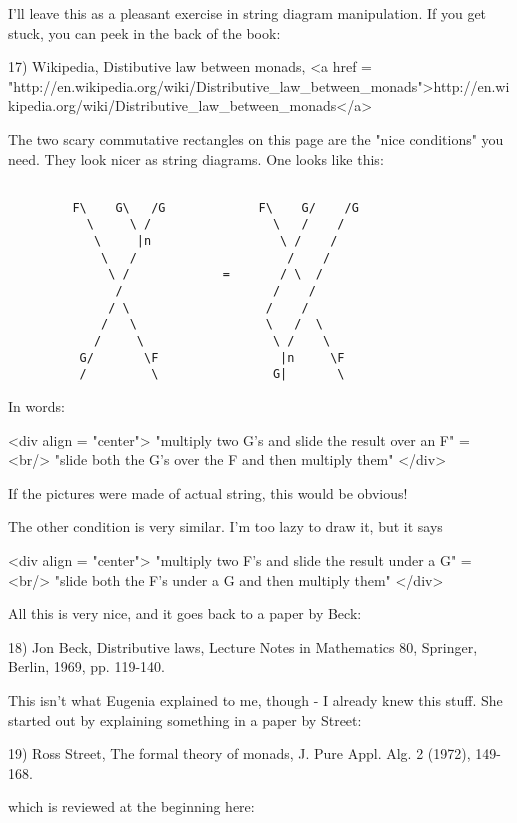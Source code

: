 I'll leave this as a pleasant exercise in string diagram 
manipulation.  If you get stuck, you can peek in the back of 
the book:

17) Wikipedia, Distibutive law between monads, 
<a href = "http://en.wikipedia.org/wiki/Distributive_law_between_monads">http://en.wikipedia.org/wiki/Distributive_law_between_monads</a>

The two scary commutative rectangles on this page are the 
"nice conditions" you need.    They look nicer as 
string diagrams.  One looks like this:


\begin{verbatim}

         F\    G\   /G             F\    G/    /G
           \     \ /                 \   /    /
            \     |n                  \ /    /
             \   /                     /    /
              \ /             =       / \  /
               /                     /    /
              / \                   /    /  
             /   \                  \   /  \
            /     \                  \ /    \
          G/       \F                 |n     \F
          /         \                G|       \

\end{verbatim}
    
In words: 

<div align = "center">
 "multiply two G's and slide the result over an F" = <br/>
 "slide both the G's over the F and then multiply them"
</div>

If the pictures were made of actual string, this would be obvious!

The other condition is very similar.  I'm too lazy to draw it,
but it says 

<div align = "center">
 "multiply two F's and slide the result under a G" = <br/>
 "slide both the F's under a G and then multiply them"
</div>

All this is very nice, and it goes back to a paper by Beck:

18) Jon Beck, Distributive laws, Lecture Notes in Mathematics 
80, Springer, Berlin, 1969, pp. 119-140. 

This isn't what Eugenia explained to me, though - I already knew
this stuff.  She started out by explaining something in a paper 
by Street:

19) Ross Street, The formal theory of monads, J. Pure Appl. Alg.
2 (1972), 149-168.

which is reviewed at the beginning here:

